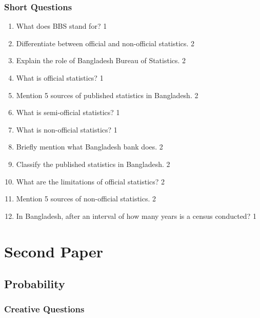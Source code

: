 \documentclass[a4paper,oneside]{book}
\begin{document}
 
 \section{Short Questions}
 \begin{enumerate}

    \item What does BBS stand for?  \hfill 1
    \item Differentiate between official and non-official statistics. \hfill 2
    \item Explain the role of Bangladesh Bureau of Statistics. \hfill 2
    \item What is official statistics?  \hfill 1
    \item Mention 5 sources of published statistics in Bangladesh. \hfill 2
    \item What is semi-official statistics?  \hfill 1
    \item What is non-official statistics?  \hfill 1
    \item Briefly mention what Bangladesh bank does.  \hfill 2
    \item Classify the published statistics in Bangladesh. \hfill 2
    \item What are the limitations of official statistics? \hfill 2
    \item Mention 5 sources of non-official statistics. \hfill 2
    \item In Bangladesh, after an interval of how many years is a census 
    conducted?  \hfill 1
    
    \end{enumerate}

\clearpage
{}
\setcounter{chapter}{0}%
\renewcommand{\theHchapter}{2.\arabic{chapter}}%
\part{Second Paper}

\chapter{Probability} 
\section{Creative Questions}
\end{document}
